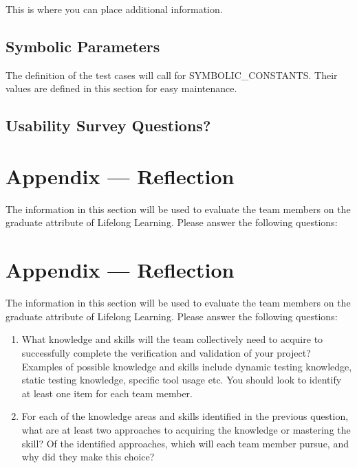 \documentclass[12pt, titlepage]{article}
\begin{document}
This is where you can place additional information.

\subsection{Symbolic Parameters}

The definition of the test cases will call for SYMBOLIC\_CONSTANTS. Their values
are defined in this section for easy maintenance.

\subsection{Usability Survey Questions?}


\newpage{}
\section*{Appendix --- Reflection}

The information in this section will be used to evaluate the team members on the
graduate attribute of Lifelong Learning.  Please answer the following questions:

\newpage{}
\section*{Appendix --- Reflection}

The information in this section will be used to evaluate the team members on the
graduate attribute of Lifelong Learning.  Please answer the following questions:

\begin{enumerate}
    \item What knowledge and skills will the team collectively need to acquire
          to successfully complete the verification and validation of your
          project? Examples of possible knowledge and skills include dynamic
          testing knowledge, static testing knowledge, specific tool usage etc.
          You should look to identify at least one item for each team member.
    \item For each of the knowledge areas and skills identified in the previous
          question, what are at least two approaches to acquiring the knowledge
          or mastering the skill?  Of the identified approaches, which will each
          team member pursue, and why did they make this choice?
\end{enumerate}
\end{document}
